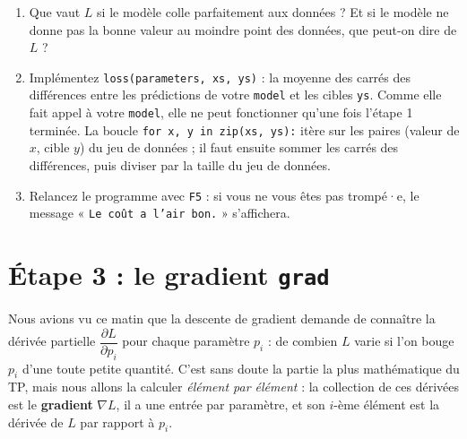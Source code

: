 \documentclass[11pt]{article}
\newcommand{\code}[1]{\texttt{#1}}
\newcommand{\fonction}[1]{\code{#1}}
\begin{document}
\begin{enumerate}[label=\textbf{Q\arabic*.}, resume]
  \item Que vaut $L$ si le modèle colle parfaitement aux données ? Et si
        le modèle ne donne pas la bonne valeur au moindre point des
        données, que peut-on dire de $L$ ?
  \item Implémentez \fonction{loss(parameters, xs, ys)} : la moyenne des
        carrés des différences entre les prédictions de votre
        \fonction{model} et les cibles \code{ys}. Comme elle fait appel à
        votre \fonction{model}, elle ne peut fonctionner qu'une fois l'étape 1
        terminée. La boucle \code{for x, y in zip(xs, ys):} itère sur les
        paires (valeur de $x$, cible $y$) du jeu de données ; il faut
        ensuite sommer les carrés des différences, puis diviser par la
        taille du jeu de données.
  \item Relancez le programme avec \code{F5} : si vous ne vous êtes pas
        trompé·e, le message « \code{Le coût a l'air bon.} » s'affichera.
\end{enumerate}

\section*{Étape 3 : le gradient \hfill \fonction{grad}}

Nous avions vu ce matin que la descente de gradient demande de connaître
la dérivée partielle $\dfrac{\partial L}{\partial p_i}$ pour chaque
paramètre $p_i$ : de combien $L$ varie si l'on bouge $p_i$ d'une toute
petite quantité. C'est sans doute la partie la plus mathématique du TP,
mais nous allons la calculer \emph{élément par élément} : la collection de
ces dérivées est le \textbf{gradient} $\nabla L$, il a une entrée par
paramètre, et son $i$-ème élément est la dérivée de $L$ par rapport à
$p_i$.
\end{document}
